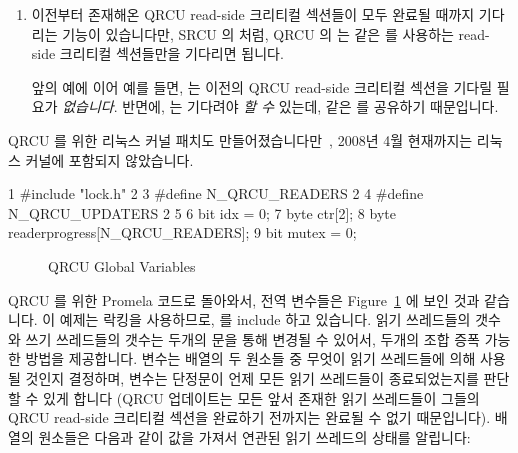\begin{enumerate}
\item	이전부터 존재해온 QRCU read-side 크리티컬 섹션들이 모두 완료될 때까지
	기다리는  기능이 있습니다만, SRCU 의
	 처럼, QRCU 의  는 같은
	 를 사용하는 read-side 크리티컬 섹션들만을 기다리면
	됩니다.

	앞의 예에 이어 예를 들면,  는
	이전의 QRCU read-side 크리티컬 섹션을 기다릴 필요가 \emph{없습니다}.
	반면에,  는 기다려야 \emph{할 수}
	있는데, 같은  를 공유하기 때문입니다.
\iffalse

\item	There is a \co{synchronize_qrcu()} primitive that blocks until
	all pre-existing QRCU read-side critical sections complete,
	but, like SRCU's \co{synchronize_srcu()}, QRCU's
	\co{synchronize_qrcu()} need wait only for those read-side
	critical sections that are using the same \co{qrcu_struct}.

	For example, \co{synchronize_qrcu(&your_qrcu_struct)}
	would \emph{not} need to wait on the earlier QRCU read-side
	critical section.
	In contrast, \co{synchronize_qrcu(&my_qrcu_struct)}
	\emph{would} need to wait, since it shares the same
	\co{qrcu_struct}.
\fi
\end{enumerate}

QRCU 를 위한 리눅스 커널 패치도
만들어졌습니다만~\cite{PaulMcKenney2007QRCUpatch}, 2008년 4월 현재까지는 리눅스
커널에 포함되지 않았습니다.
\iffalse

A Linux-kernel patch for QRCU has been
produced~\cite{PaulMcKenney2007QRCUpatch},
but has not yet been included in the Linux kernel as of
April 2008.
\fi

{ \scriptsize
\begin{verbbox}
  1 #include "lock.h"
  2
  3 #define N_QRCU_READERS 2
  4 #define N_QRCU_UPDATERS 2
  5
  6 bit idx = 0;
  7 byte ctr[2];
  8 byte readerprogress[N_QRCU_READERS];
  9 bit mutex = 0;
\end{verbbox}
}
\begin{figure}[htbp]
\centering
\theverbbox
\caption{QRCU Global Variables}
\label{fig:analysis:QRCU Global Variables}
\end{figure}

QRCU 를 위한 Promela 코드로 돌아와서, 전역 변수들은
Figure~\ref{fig:analysis:QRCU Global Variables} 에 보인 것과 같습니다.
이 예제는 락킹을 사용하므로,  를 include 하고 있습니다.
읽기 쓰레드들의 갯수와 쓰기 쓰레드들의 갯수는 두개의  문을 통해
변경될 수 있어서, 두개의 조합 증폭 가능한 방법을 제공합니다.
 변수는  배열의 두 원소들 중 무엇이 읽기 쓰레드들에 의해 사용될
것인지 결정하며,  변수는 단정문이 언제 모든 읽기 쓰레드들이
종료되었는지를 판단할 수 있게 합니다 (QRCU 업데이트는 모든 앞서 존재한 읽기
쓰레드들이 그들의 QRCU read-side 크리티컬 섹션을 완료하기 전까지는 완료될 수
없기 때문입니다).
 배열의 원소들은 다음과 같이 값을 가져서 연관된 읽기
쓰레드의 상태를 알립니다:
\iffalse

